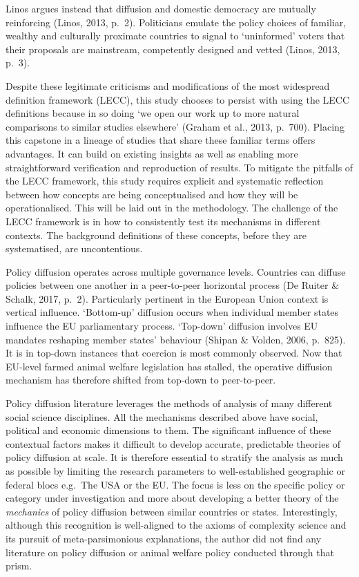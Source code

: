 \documentclass[twocolumn, 10pt, a4paper]{article}
\begin{document}
Linos argues instead that diffusion and domestic democracy are mutually reinforcing
(Linos, 2013, p.~2). Politicians emulate the policy choices of familiar, wealthy and
culturally proximate countries to signal to `uninformed' voters that their proposals
are mainstream, competently designed and vetted (Linos, 2013, p.~3).

Despite these legitimate criticisms and modifications of the most widespread
definition framework (LECC), this study chooses to persist with using the LECC
definitions because in so doing `we open our work up to more natural comparisons to
similar studies elsewhere' (Graham et al., 2013, p.~700). Placing this capstone in a
lineage of studies that share these familiar terms offers advantages. It can build on
existing insights as well as enabling more straightforward verification and
reproduction of results. To mitigate the pitfalls of the LECC framework, this study
requires explicit and systematic reflection between how concepts are being
conceptualised and how they will be operationalised. This will be laid out in the
methodology. The challenge of the LECC framework is in how to consistently test its
mechanisms in different contexts. The background definitions of these concepts, before
they are systematised, are uncontentious.

Policy diffusion operates across multiple governance levels. Countries can diffuse
policies between one another in a peer-to-peer horizontal process (De Ruiter \&
Schalk, 2017, p.~2). Particularly pertinent in the European Union context is vertical
influence. `Bottom-up' diffusion occurs when individual member states influence the EU
parliamentary process. `Top-down' diffusion involves EU mandates reshaping member
states' behaviour (Shipan \& Volden, 2006, p.~825). It is in top-down instances that
coercion is most commonly observed. Now that EU-level farmed animal welfare
legislation has stalled, the operative diffusion mechanism has therefore shifted from
top-down to peer-to-peer.

Policy diffusion literature leverages the methods of analysis of many different social
science disciplines. All the mechanisms described above have social, political and
economic dimensions to them. The significant influence of these contextual factors
makes it difficult to develop accurate, predictable theories of policy diffusion at
scale. It is therefore essential to stratify the analysis as much as possible by
limiting the research parameters to well-established geographic or federal blocs e.g.\
The USA or the EU. The focus is less on the specific policy or category under
investigation and more about developing a better theory of the \textit{mechanics} of
policy diffusion between similar countries or states. Interestingly, although this
recognition is well-aligned to the axioms of complexity science and its pursuit of
meta-parsimonious explanations, the author did not find any literature on policy
diffusion or animal welfare policy conducted through that prism.
\end{document}
